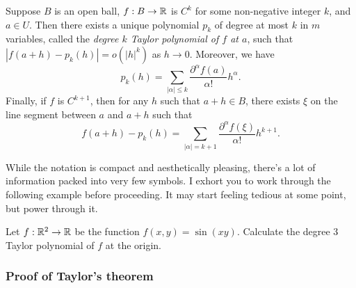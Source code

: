 \begin{theorem}[Taylor] \label{taylor}
	Suppose $B$ is an open ball, $f : B \to \mathbb{R}$ is $C^k$ for some non-negative integer $k$, and $a \in U$. Then there exists a unique polynomial $p_k$ of degree at most $k$ in $m$ variables, called the \emph{degree $k$ Taylor polynomial of $f$ at $a$}, such that $|f(a+h) - p_k(h)| = o(|h|^k)$ as $h \to 0$. Moreover, we have
	\begin{equation} \label{taylor-polynomial} p_k(h) = \sum_{|\alpha| \leq k} \frac{\partial^\alpha f(a)}{\alpha!} h^\alpha. \end{equation}
	Finally, if $f$ is $C^{k+1}$, then for any $h$ such that $a + h \in B$, there exists $\xi$ on the line segment between $a$ and $a+h$ such that 
	\[ f(a+h) - p_k(h) = \sum_{|\alpha| = k+1} \frac{\partial^\alpha f(\xi)}{\alpha!} h^{k+1}. \]
\end{theorem}

While the notation is compact and aesthetically pleasing, there's a lot of information packed into very few symbols. I exhort you to work through the following example before proceeding. It may start feeling tedious at some point, but power through it. 

\begin{exercise}
	Let $f : \mathbb{R}^2 \to \mathbb{R}$ be the function $f(x,y) = \sin(xy)$. Calculate the degree 3 Taylor polynomial of $f$ at the origin. 
\end{exercise}

\subsubsection*{Proof of Taylor's theorem}

